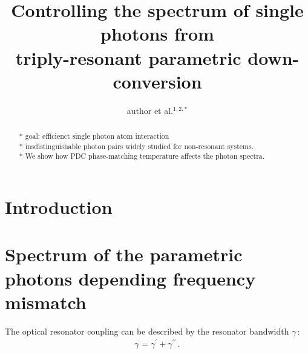 \documentclass[aps,pra,showpacs,reprint,onecolumn,notitlepage]{revtex4-1}
\begin{document}
\title{Controlling the spectrum of single photons from\\ triply-resonant parametric down-conversion}
\author{author et al.$^{1,2,*}$}


\begin{abstract}
* goal: efficienct single photon atom interaction \\
* insdistinguishable photon pairs widely studied for non-resonant systems. \\
* We show how PDC phase-matching temperature affects the photon spectra.
\end{abstract}

\maketitle 


\section{Introduction}

\section{Spectrum of the parametric photons depending frequency mismatch}
The optical resonator coupling can be described by the resonator bandwidth $\gamma\,$:
\begin{align}
	\gamma_\textrm{} = \gamma^{\prime}_\textrm{} + \gamma^{\prime\prime}_\textrm{} \, .
	\label{eq:resbandwidth}
\end{align}
\end{document}
